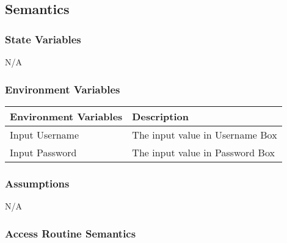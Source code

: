 \documentclass[12pt, titlepage]{article}
\begin{document}
\subsection{Semantics}

\subsubsection{State Variables}

N/A

\subsubsection{Environment Variables}

\begin{center}
\begin{tabular}{|p{8cm}|p{6cm}|}
\hline
\textbf{Environment Variables} & \textbf{Description}\\
\hline
Input Username & The input value in Username Box\\
\hline
Input Password & The input value in Password Box\\
\hline

\end{tabular}
\end{center}

\subsubsection{Assumptions}

N/A

\subsubsection{Access Routine Semantics}
\end{document}
